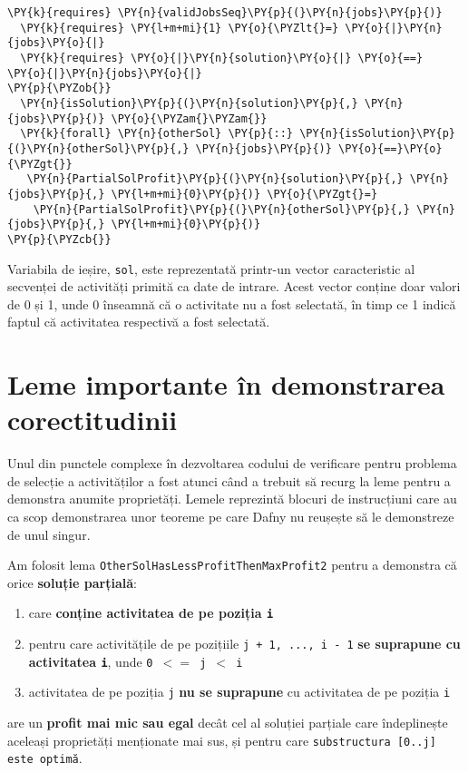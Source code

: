 \begin{itemize}
\begin{footnotesize}
\begin{Verbatim}[commandchars=\\\{\}, fontsize=\footnotesize]
  \PY{k}{requires} \PY{n}{validJobsSeq}\PY{p}{(}\PY{n}{jobs}\PY{p}{)}
  \PY{k}{requires} \PY{l+m+mi}{1} \PY{o}{\PYZlt{}=} \PY{o}{|}\PY{n}{jobs}\PY{o}{|}
  \PY{k}{requires} \PY{o}{|}\PY{n}{solution}\PY{o}{|} \PY{o}{==} \PY{o}{|}\PY{n}{jobs}\PY{o}{|}
\PY{p}{\PYZob{}}
  \PY{n}{isSolution}\PY{p}{(}\PY{n}{solution}\PY{p}{,} \PY{n}{jobs}\PY{p}{)} \PY{o}{\PYZam{}\PYZam{}}
  \PY{k}{forall} \PY{n}{otherSol} \PY{p}{::} \PY{n}{isSolution}\PY{p}{(}\PY{n}{otherSol}\PY{p}{,} \PY{n}{jobs}\PY{p}{)} \PY{o}{==}\PY{o}{\PYZgt{}} 
   \PY{n}{PartialSolProfit}\PY{p}{(}\PY{n}{solution}\PY{p}{,} \PY{n}{jobs}\PY{p}{,} \PY{l+m+mi}{0}\PY{p}{)} \PY{o}{\PYZgt{}=} 
    \PY{n}{PartialSolProfit}\PY{p}{(}\PY{n}{otherSol}\PY{p}{,} \PY{n}{jobs}\PY{p}{,} \PY{l+m+mi}{0}\PY{p}{)}
\PY{p}{\PYZcb{}}
\end{Verbatim}
\end{footnotesize}
\end{itemize} 


Variabila de ieșire, \texttt{sol}, este reprezentată printr-un vector caracteristic al secvenței de activități primită ca date de intrare. Acest vector conține doar valori de 0 și 1, unde 0 înseamnă că o activitate nu a fost selectată, în timp ce 1 indică faptul că activitatea respectivă a fost selectată.

\section{Leme importante în demonstrarea corectitudinii}
Unul din punctele complexe în dezvoltarea codului de verificare pentru problema de selecție a activităților a fost atunci când a trebuit să recurg la leme pentru a demonstra anumite proprietăți. Lemele reprezintă blocuri de instrucțiuni care au ca scop demonstrarea unor teoreme pe care Dafny nu reușește să le demonstreze de unul singur.

Am folosit lema \texttt{OtherSolHasLessProfitThenMaxProfit2} pentru a demonstra că orice \textbf{soluție parțială}:
\begin{enumerate}
    \item care \textbf{conține activitatea de pe poziția \texttt{i}}
    \item pentru care activitățile de pe pozițiile \texttt{j + 1, ..., i - 1} \textbf{se suprapune cu activitatea \texttt{i}}, unde \texttt{0 $<=$ j $<$ i}
    \item activitatea de pe poziția \texttt{j} \textbf{nu se suprapune} cu activitatea de pe poziția \texttt{i} 
\end{enumerate}
are un \textbf{profit mai mic sau egal} decât cel al soluției parțiale care îndeplinește aceleași proprietăți menționate mai sus, și pentru care \texttt{substructura [0..j] este optimă}. 

